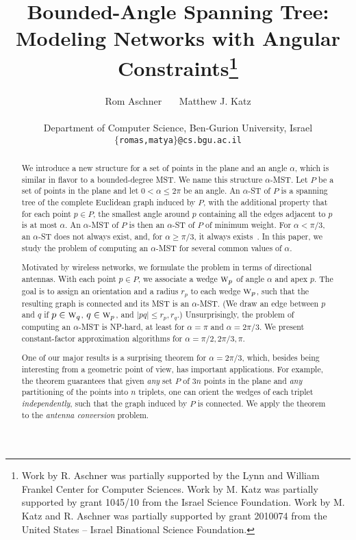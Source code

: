 \documentclass[11pt]{article}
\def\wedge#1{{\textsc{w}_{#1}}}
\begin{document}
\title{Bounded-Angle Spanning Tree: Modeling Networks with Angular Constraints\thanks{Work by R. Aschner was partially supported by the Lynn and William Frankel Center for Computer Sciences. Work by M. Katz was partially supported by grant 1045/10 from the Israel Science Foundation. Work by M. Katz and R. Aschner was partially supported by grant 2010074 from the United States -- Israel Binational Science Foundation.}
}


\author{Rom Aschner \ \ \  Matthew J. Katz
\\
\\
{\small Department of Computer Science, Ben-Gurion University, Israel} \\
{\small {\tt $\{$romas,matya$\}$@cs.bgu.ac.il}}
}



\maketitle


\begin{abstract} 
We introduce a new structure for a set of points in the plane and an angle $\alpha$, which is similar in flavor to a bounded-degree MST. We name this structure $\alpha$-MST. 
Let $P$ be a set of points in the plane and let $0 < \alpha \le 2\pi$ be an angle. An $\alpha$-ST of $P$ is a spanning tree of the complete Euclidean graph induced by $P$, with the additional property that for each point $p \in P$, the smallest angle around $p$ containing all the edges adjacent to $p$ is at most $\alpha$. An $\alpha$-MST of $P$ is then an $\alpha$-ST of $P$ of minimum weight.
For $\alpha < \pi/3$, an $\alpha$-ST does not always exist, and, for $\alpha \ge \pi/3$, it always exists~\cite{AGP13,AHHHPSSV13,CKLR11}. In this paper, we study the problem of computing an $\alpha$-MST for several common values of $\alpha$.


Motivated by wireless networks, 
we formulate the problem in terms of directional antennas. With each point $p \in P$, we associate a wedge $\wedge{p}$ of angle $\alpha$ and apex $p$.
The goal is to assign an orientation and a radius $r_p$ to each wedge $\wedge{p}$, such that the resulting graph is connected and its MST is an $\alpha$-MST. (We draw an edge between $p$ and $q$ if $p \in \wedge{q}$, $q \in \wedge{p}$, and $|pq| \le r_p, r_q$.)
Unsurprisingly, the problem of computing an $\alpha$-MST is NP-hard, at least for $\alpha=\pi$ and $\alpha=2\pi/3$. We present constant-factor approximation algorithms for $\alpha = \pi/2, 2\pi/3, \pi$.

One of our major results is a surprising theorem for $\alpha = 2\pi/3$, which, besides being interesting from a geometric point of view, has important applications. For example, the theorem guarantees that 
given {\em any} set $P$ of $3n$ points in the plane and {\em any} partitioning of the points into $n$ triplets, one can orient the wedges of each triplet {\em independently}, such that the graph induced by $P$ is connected. We apply the theorem to the {\em antenna conversion} problem.
\end{abstract}
\end{document}
